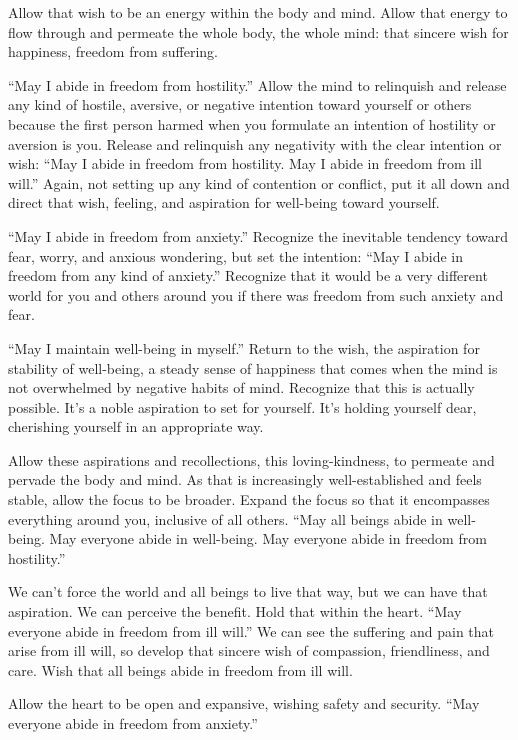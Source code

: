 Allow that wish to be an energy within the body and mind. Allow that
energy to flow through and permeate the whole body, the whole mind: that
sincere wish for happiness, freedom from suffering.

“May I abide in freedom from hostility.” Allow the mind to relinquish
and release any kind of hostile, aversive, or negative intention toward
yourself or others because the first person harmed when you formulate an
intention of hostility or aversion is you. Release and relinquish any
negativity with the clear intention or wish: “May I abide in freedom
from hostility. May I abide in freedom from ill will.” Again, not
setting up any kind of contention or conflict, put it all down and
direct that wish, feeling, and aspiration for well-being toward
yourself.

“May I abide in freedom from anxiety.” Recognize the inevitable tendency
toward fear, worry, and anxious wondering, but set the intention: “May I
abide in freedom from any kind of anxiety.” Recognize that it would be a
very different world for you and others around you if there was freedom
from such anxiety and fear.

“May I maintain well-being in myself.” Return to the wish, the
aspiration for stability of well-being, a steady sense of happiness that
comes when the mind is not overwhelmed by negative habits of mind.
Recognize that this is actually possible. It’s a noble aspiration to set
for yourself. It’s holding yourself dear, cherishing yourself in an
appropriate way.

Allow these aspirations and recollections, this loving-kindness, to
permeate and pervade the body and mind. As that is increasingly
well-established and feels stable, allow the focus to be broader. Expand
the focus so that it encompasses everything around you, inclusive of all
others. “May all beings abide in well-being. May everyone abide in
well-being. May everyone abide in freedom from hostility.”

We can’t force the world and all beings to live that way, but we can
have that aspiration. We can perceive the benefit. Hold that within the
heart. “May everyone abide in freedom from ill will.” We can see the
suffering and pain that arise from ill will, so develop that sincere
wish of compassion, friendliness, and care. Wish that all beings abide
in freedom from ill will.

Allow the heart to be open and expansive, wishing safety and security.
“May everyone abide in freedom from anxiety.”

